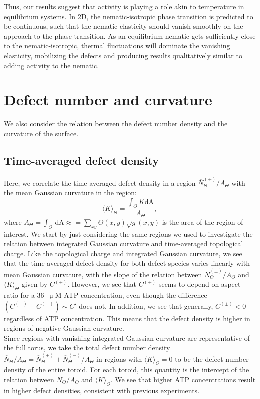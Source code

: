 Thus, our results suggest that activity is playing a role akin to temperature in equilibrium systems.
In 2D, the  nematic-isotropic phase transition is predicted to be continuous, such that the nematic elasticity should vanish smoothly on the approach to the phase transition.
As an equilibrium nematic gets sufficiently close to the nematic-isotropic, thermal fluctuations will dominate the vanishing elasticity, mobilizing the defects and producing results qualitatively similar to adding activity to the nematic.




\section{Defect number and curvature}
We also consider the relation between the defect number density and the curvature of the surface.


\subsection{Time-averaged defect density}
Here, we correlate the time-averaged defect density in a region  $\overbar{N}^{(\pm)}_{\Theta}/A_{\Theta}$ with the mean Gaussian curvature in the region:
\begin{equation}
  \langle K \rangle_{\Theta} = \frac{\int_{\Theta}K\textrm{dA}}{A_{\Theta}},
\end{equation}
where $A_{\Theta} = \int_{\Theta}\, \textrm{dA} \approx = \sum\limits_{xy}\Theta(x,y)\sqrt{g}(x,y)$ is the area of the region of interest.
We start by just considering the same regions we used to investigate the relation between integrated Gaussian curvature and time-averaged topological charge.
Like the topological charge and integrated Gaussian curvature, we see that the time-averaged defect density for both defect species varies linearly with mean Gaussian curvature, with the slope of the relation between $\overbar{N}^{(\pm)}_{\Theta}/A_{\Theta}$ and $\langle K \rangle_{\Theta}$ given by $C^{(\pm)}$.
However, we see that $C^{(\pm)}$ seems to depend on aspect ratio for a 36~$\upmu$M ATP concentration, even though the difference $(C^{(+)} - C^{(-)}) \sim C'$ does not.
In addition, we see that generally, $C^{(\pm)} < 0$ regardless of ATP concentration.
This means that the defect density is higher in regions of negative Gaussian curvature. \\

Since regions with vanishing integrated Gaussian curvature are representative of the full torus, we take the total defect number density $\overbar{N}_{\Theta}/A_{\Theta} = \overbar{N}^{(+)}_{\Theta} + \overbar{N}^{(-)}_{\Theta}/A_{\Theta}$ in regions with $\langle K \rangle_{\Theta} = 0 $ to be the defect number density of the entire toroid.
For each toroid, this quantity is the intercept of the relation between $\overbar{N}_{\Theta}/A_{\Theta}$ and $\langle K \rangle_{\Theta}$.
We see that higher ATP concentrations result in higher defect densities, consistent with previous experiments. \\

